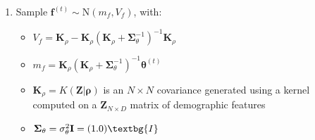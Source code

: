 \documentclass[12pt,letterpaper]{article}
\begin{document}
\begin{enumerate}[(1)]
\begin{itemize}
    \end{itemize}
    \item Sample $\textbf{f}^{(t)} \sim \text{N}(m_f, V_f)$, with:
    \begin{itemize}
        \item $V_f = \textbf{K}_{\rho} - \textbf{K}_{\rho}(\textbf{K}_{\rho} + \boldsymbol{\Sigma}_{\theta}^{-1})^{-1}\textbf{K}_{\rho}$
        \item $m_f = \textbf{K}_{\rho}(\textbf{K}_{\rho} + \boldsymbol{\Sigma}_{\theta}^{-1})^{-1}\boldsymbol{\theta}^{(t)}$
        \item $\textbf{K}_{\rho} = K(\textbf{Z}|\boldsymbol{\rho})$ is an $N \times N$ covariance generated using a kernel computed on a $\textbf{Z}_{N \times D}$ matrix of demographic features
        \item $\boldsymbol{\Sigma}_{\theta} = \sigma_{\theta}^{2}\textbf{I} = (1.0) \textbg{I}$
    \end{itemize}
\end{enumerate}
\end{document}
